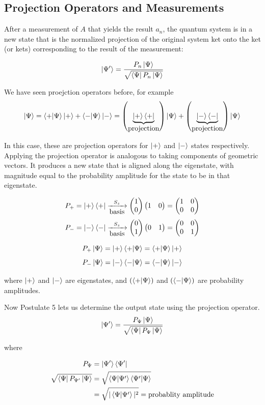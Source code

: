 \documentclass[english, 11pt]{article}
\begin{document}
    \subsection{Projection Operators and Measurements}

      \begin{defn}[Postulate 5]\label{postulate_5}
        After a measurement of $A$ that yields the result $a_n$, the quantum system is in a new state that is the normalized projection of the original system ket onto the ket (or kets) corresponding to the result of the measurement:

        \[ \left|\Psi'\right\rangle = \frac{P_n\left|\Psi\right\rangle}{\sqrt{\left\langle\Psi\right|P_n\left|\Psi\right\rangle}} \]
      \end{defn}

      We have seen proejction operators before, for example
      \[ \kpsi = \braket{+}{\Psi}\kp + \braket{-}{\Psi}\ket{-} = \left( \underbrace{\kp\bp}_{\mbox{projection}} \right)\kpsi + \left( \underbrace{\km\bm}_{\mbox{projection}}  \right)\kpsi\]

      In this case, these are projection operators for $\left|+\right\rangle$ and $\left|-\right\rangle$ states respectively. Applying the projection operator is analogous to taking components of geometric vectors. It produces a new state that is aligned along the eigenstate, with magnitude equal to the probability amplitude for the state to be in that eigenstate.

      \[ P_+ = \left|+\right\rangle\left\langle+\right| \xrightarrow[\mbox{basis}]{S_z} \left(\begin{matrix}1 \\0\end{matrix}\right)\left(\begin{matrix}1 & 0\end{matrix}\right) = \left(\begin{matrix}1 & 0 \\ 0 & 0\end{matrix}\right) \]
      \[ P_- = \left|-\right\rangle\left\langle-\right| \xrightarrow[\mbox{basis}]{S_z} \left(\begin{matrix}0 \\1\end{matrix}\right)\left(\begin{matrix}0 & 1\end{matrix}\right) = \left(\begin{matrix}0 & 0 \\ 0 & 1\end{matrix}\right) \]

      \[ P_+\kpsi = \kp\braket{+}{\Psi} = \braket{+}{\Psi} \kp \]
      \[ P_-\kpsi = \km\braket{-}{\Psi} = \braket{-}{\Psi} \km \]

      where $\left|+\right\rangle$ and $\left|-\right\rangle$ are eigenstates, and $\left( \braket{+}{\Psi} \right)$ and $\left( \braket{-}{\Psi} \right)$ are probability amplitudes.\
      \newline

      Now Postulate 5 lets us determine the output state using the projection operator.
      \[ \left|\Psi'\right\rangle = \frac{P_\Psi\left|\Psi\right\rangle}{\sqrt{\left\langle\Psi\right|P_\Psi\left|\Psi\right\rangle}} \]

      where

      \begin{align*}
        P_\Psi & = \ket{\Psi'}\bra{\Psi'} \\
        \sqrt{\bra{\Psi}P_{\Psi'}\kpsi} & = \sqrt{\braket{\Psi}{\Psi'}\braket{\Psi'}{\Psi}} \\
        & = \sqrt{|\braket{\Psi}{\Psi'}|^2} = \mbox{probablity amplitude}
      \end{align*}
\end{document}
